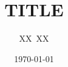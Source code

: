 \documentclass{beamer}
\title{TITLE}
\institute{INSTITUTE}
\author{XX\ XX}
\date{\today}
\begin{document}
\begin{frame}[t]
  \begin{columns}[t]
    \begin{column}{0.5\textwidth}
      
    \end{column}
    \begin{column}{0.5\textwidth}
      
    \end{column}
  \end{columns}
  \begin{columns}[t]
    \begin{column}{0.5\textwidth}
      
    \end{column}
    \begin{column}{0.5\textwidth}
      
    \end{column}
  \end{columns}
  \begin{columns}[t]
    \begin{column}{0.5\textwidth}
      
    \end{column}
    \begin{column}{0.5\textwidth}
      
    \end{column}
  \end{columns}
\end{frame}
\end{document}
